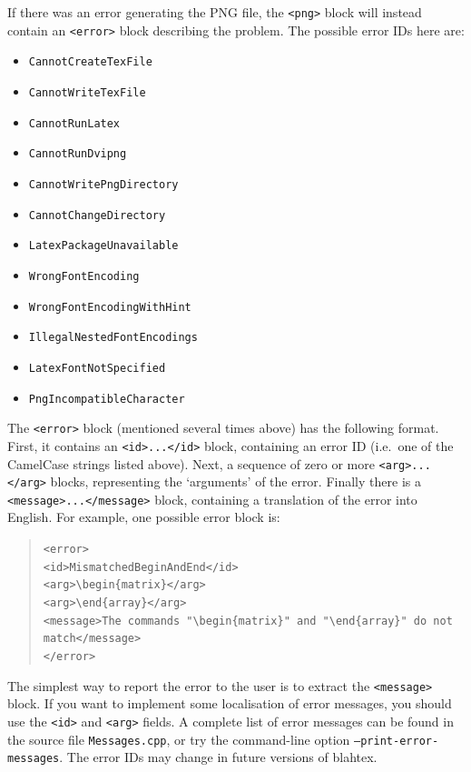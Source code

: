\documentclass{article}
\newcommand{\texcommand}[1]{\textbackslash{}#1}
\begin{document}
\begin{itemize}
\begin{itemize}
If there was an error generating the PNG file, the \texttt{<png>} block will instead contain an \texttt{<error>} block describing the problem. The possible error IDs here are:
\begin{itemize}
\item \texttt{CannotCreateTexFile}
\item \texttt{CannotWriteTexFile}
\item \texttt{CannotRunLatex}
\item \texttt{CannotRunDvipng}
\item \texttt{CannotWritePngDirectory}
\item \texttt{CannotChangeDirectory}
\item \texttt{LatexPackageUnavailable}
\item \texttt{WrongFontEncoding}
\item \texttt{WrongFontEncodingWithHint}
\item \texttt{IllegalNestedFontEncodings}
\item \texttt{LatexFontNotSpecified}
\item \texttt{PngIncompatibleCharacter}
\end{itemize}

\end{itemize}
\end{itemize}

The \texttt{<error>} block (mentioned several times above) has the following format. First, it contains an \texttt{<id>...</id>} block, containing an error ID (i.e.~one of the CamelCase strings listed above). Next, a sequence of zero or more \texttt{<arg>...</arg>} blocks, representing the `arguments' of the error. Finally there is a \texttt{<message>...</message>} block, containing a translation of the error into English. For example, one possible error block is:

\begin{quote}
\texttt{<error>}\\
\texttt{<id>MismatchedBeginAndEnd</id>}\\
\texttt{<arg>\texcommand{begin}\{matrix\}</arg>}\\
\texttt{<arg>\texcommand{end}\{array\}</arg>}\\
\texttt{<message>The commands "\texcommand{begin}\{matrix\}" and "\texcommand{end}\{array\}" do not match</message>}\\
\texttt{</error>}
\end{quote}

The simplest way to report the error to the user is to extract the \texttt{<message>} block. If you want to implement some localisation of error messages, you should use the \texttt{<id>} and \texttt{<arg>} fields. A complete list of error messages can be found in the source file \texttt{Messages.cpp}, or try the command-line option \texttt{--print-error-messages}. The error IDs may change in future versions of blahtex.
\end{document}
